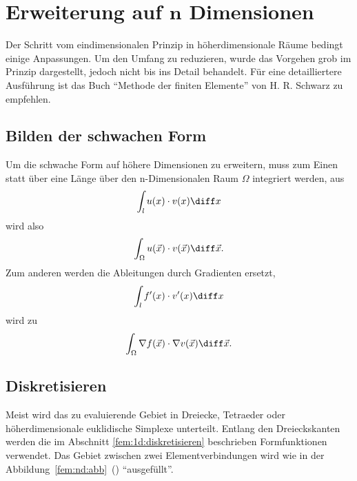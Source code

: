 %
%
%
%
\section{Erweiterung auf $\mathbf{n}$ Dimensionen\label{fem:nD}}
Der Schritt vom eindimensionalen Prinzip in höherdimensionale Räume bedingt einige Anpassungen. 
Um den Umfang zu reduzieren, wurde das Vorgehen grob im Prinzip dargestellt, jedoch nicht bis ins Detail behandelt.
Für eine detailliertere Ausführung ist das Buch ``Methode der finiten Elemente'' \cite{fem:bib:methode_der_finiten_elemente} von H. R. Schwarz zu empfehlen.


\subsection{Bilden der schwachen Form}
Um die schwache Form auf höhere Dimensionen zu erweitern, muss zum Einen statt über eine Länge über den n-Dimensionalen Raum $\Omega$ integriert werden, aus 
\begin{equation}
    \int_{l} u(x) \cdot v(x) \diff x
\end{equation}
wird also
\begin{equation}
    \int_{\Omega} u(\vec{x}) \cdot v(\vec{x}) \diff \vec{x}.
\end{equation}
Zum anderen werden die Ableitungen durch Gradienten ersetzt,
\begin{equation}
    \int_{l} f'(x) \cdot v'(x) \diff x
\end{equation}
wird zu
\begin{equation}
    \int_{\Omega} \nabla f(\vec{x}) \cdot \nabla v(\vec{x}) \diff \vec{x}.
\end{equation}


\subsection{Diskretisieren}
Meist wird das zu evaluierende Gebiet in Dreiecke, Tetraeder oder höherdimensionale euklidische Simplexe unterteilt. 
Entlang den Dreieckskanten werden die im Abschnitt \ref{fem:1d:diskretisieren} beschrieben Formfunktionen verwendet.
Das Gebiet zwischen zwei Elementverbindungen wird wie in der Abbildung~\ref{fem:nd:abb}~() ``ausgefüllt''.



